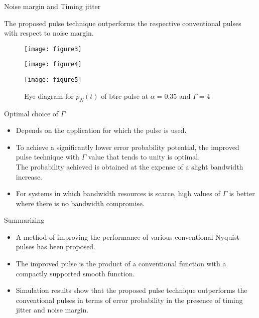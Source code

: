 \documentclass[10pt]{beamer}
\begin{document}
\begin{frame}{Noise margin and Timing jitter}
\begin{block}{}
 The proposed pulse technique outperforms the respective conventional pulses with respect to noise margin.
\begin{figure}[!htb]
  \texttt{[image: figure3]}
 \caption{Eye diagram for rcos pulse at $\alpha=0.35$} 
\endminipage\hfill
{}
  \texttt{[image: figure4]}
 \caption{Eye diagram for $p_{N}(t)$ of rcos pulse at $\alpha=0.35$ and $\Gamma=8$} \label{fig:awesome_image2}
\endminipage\hfill
{}%
  \texttt{[image: figure5]}
  \caption{Eye diagram for $p_{N}(t)$ of btrc pulse at $\alpha=0.35$ and $\Gamma=4$} \label{fig:awesome_image3}
\endminipage
\end{figure}
 
\end{block}


\end{frame}
\begin{frame}{Optimal choice of $\Gamma$}
\begin{itemize}
\item Depends on the application for which the pulse is used.
\item To achieve a significantly lower error probability potential, the improved pulse technique with $\Gamma$ value that tends to unity is optimal.\\
The probability achieved is obtained at the expense of a slight bandwidth increase.
\item For systems in which bandwidth resources is scarce, high values of $\Gamma$ is better where there is no bandwidth compromise.
\end{itemize}
\end{frame}
\begin{frame}{Summarizing}
\begin{itemize}
\item A method of improving the performance of various conventional Nyquist pulses has been proposed.
\item The improved pulse is the product of a conventional function with a compactly supported smooth function.
\item Simulation results show that the proposed pulse technique outperforms the conventional pulses in terms of error probability in the presence of timing jitter and noise margin.
\end{itemize}
\end{frame}
\end{document}
